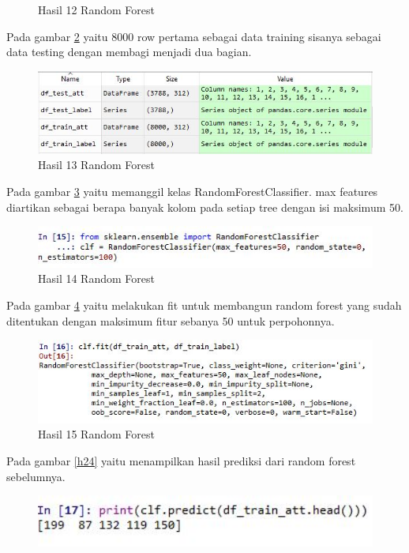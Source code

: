 \begin{enumerate}
\begin{figure}[!htbp]
	\caption{Hasil 12 Random Forest}
	\label{h20}
\end{figure}
\subitem Pada gambar \ref{h21} yaitu 8000 row pertama sebagai data training sisanya sebagai data testing dengan membagi menjadi dua bagian.
\begin{figure}[!htbp]
	\centerline{\includegraphics[width=1\textwidth]{figures/huda/chapter3_praktek/17.JPG}}
	\caption{Hasil 13 Random Forest}
	\label{h21}
\end{figure}
\subitem Pada gambar \ref{h22} yaitu memanggil kelas RandomForestClassifier. max features diartikan sebagai berapa banyak kolom pada setiap tree dengan isi maksimum 50.
\begin{figure}[!htbp]
	\centerline{\includegraphics[width=1\textwidth]{figures/huda/chapter3_praktek/18.JPG}}
	\caption{Hasil 14 Random Forest}
	\label{h22}
\end{figure}
\subitem Pada gambar \ref{h23} yaitu melakukan fit untuk membangun random forest yang sudah ditentukan dengan maksimum fitur sebanya 50 untuk perpohonnya.
\begin{figure}[!htbp]
	\centerline{\includegraphics[width=1\textwidth]{figures/huda/chapter3_praktek/19.JPG}}
	\caption{Hasil 15 Random Forest}
	\label{h23}
\end{figure}
\subitem Pada gambar \ref{h24} yaitu menampilkan hasil prediksi dari random forest sebelumnya.
\begin{figure}[!htbp]
	\centerline{\includegraphics[width=1\textwidth]{figures/huda/chapter3_praktek/20.JPG}}

\end{figure}
\end{enumerate}
